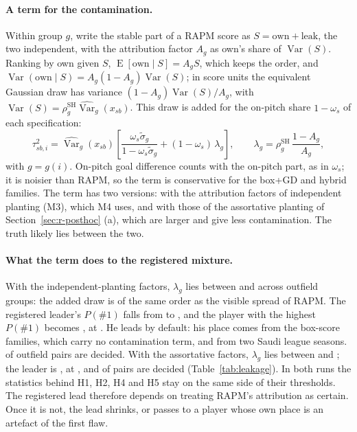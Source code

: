 \documentclass[11pt,a4paper]{article}
\DeclareMathOperator{\Var}{Var}
\DeclareMathOperator{\E}{E}
\begin{document}
\paragraph{A term for the contamination.}
Within group $g$, write the stable part of a RAPM
score as $S = \text{own} + \text{leak}$, the two independent, with the
attribution factor $A_g$ as own's share of $\Var(S)$. Ranking by own given $S$,
$\E[\text{own} \mid S] = A_g S$, which keeps the order, and
$\Var(\text{own} \mid S) = A_g (1 - A_g) \Var(S)$; in score units the equivalent
Gaussian draw has variance $(1 - A_g)\Var(S)/A_g$, with
$\Var(S) = \rho^{\mathrm{SH}}_g \widehat{\Var}_g(x_{sb})$. This draw is added
for the on-pitch share $1 - \omega_s$ of each specification:
\begin{equation}
  \tau^2_{sb,i} = \widehat{\Var}_{g}(x_{sb}) \left[
  \frac{\omega_s \tilde\sigma_{g}}{1 - \omega_s \tilde\sigma_{g}}
  + (1 - \omega_s)\, \lambda_g \right],
  \qquad
  \lambda_g = \rho^{\mathrm{SH}}_g \, \frac{1 - A_g}{A_g},
  \label{eq:tau-leak}
\end{equation}
with $g = g(i)$. On-pitch goal difference counts with the on-pitch part, as in
$\omega_s$; it is noisier than RAPM, so the term is conservative for the box+GD
and hybrid families. The term has two versions: with the attribution factors
of independent planting (M3), which M4 uses, and with those of the assortative
planting of Section~\ref{sec:r-posthoc} (a), which are larger and give less
contamination. The truth likely lies between the two.

\paragraph{What the term does to the registered mixture.}
With the independent-planting factors, $\lambda_g$ lies between
\LeakLambdaIndepLo{} and \LeakLambdaIndepHi{} across outfield groups: the added
draw is of the same order as the visible spread of RAPM. The registered
leader's $P(\#1)$ falls from \TopPlayerPFirst{} to \LeakIndepLeaderPFirst{},
and the player with the highest $P(\#1)$ becomes \LeakIndepTopName{}, at
\LeakIndepTopPFirst{}. He leads by default: his place comes from the box-score
families, which carry no contamination term, and from two Saudi league
seasons. \LeakIndepSharePairsDecided{} of outfield pairs are decided. With the
assortative factors, $\lambda_g$ lies between \LeakLambdaAssortLo{} and
\LeakLambdaAssortHi{}; the leader is \LeakAssortTopName{}, at
\LeakAssortTopPFirst{}, and \LeakAssortSharePairsDecided{} of pairs are decided
(Table~\ref{tab:leakage}). In both runs the statistics behind H1, H2, H4 and H5
stay on the same side of their thresholds. The registered lead therefore
depends on treating RAPM's attribution as certain. Once it is not, the lead
shrinks, or passes to a player whose own place is an artefact of the first
flaw.
\end{document}
